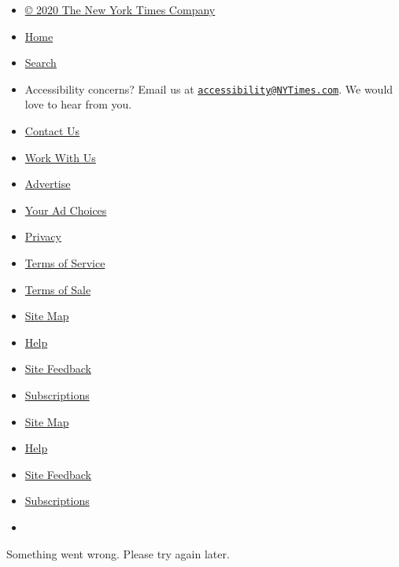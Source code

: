\begin{itemize}
\tightlist
\item
  \href{https://help.nytimes3xbfgragh.onion/hc/en-us/articles/115014792127-Copyright-notice}{©
  2020 The New York Times Company}
\item
  \href{https://www.nytimes3xbfgragh.onion}{Home}
\item
  \href{http://query.nytimes3xbfgragh.onion/search/sitesearch/\#/}{Search}
\item
  Accessibility concerns? Email us at
  \href{mailto:accessibility@NYTimes.com}{\nolinkurl{accessibility@NYTimes.com}}.
  We would love to hear from you.
\item
  \href{https://www.nytimes3xbfgragh.onion/ref/membercenter/help/infoservdirectory.html}{Contact
  Us}
\item
  \href{http://www.nytco.com/careers}{Work With Us}
\item
  \href{http://nytmediakit.com/}{Advertise}
\item
  \href{https://www.nytimes3xbfgragh.onion/content/help/rights/privacy/policy/privacy-policy.html\#pp}{Your
  Ad Choices}
\item
  \href{https://www.nytimes3xbfgragh.onion/privacy}{Privacy}
\item
  \href{https://help.nytimes3xbfgragh.onion/hc/en-us/articles/115014893428-Terms-of-service}{Terms
  of Service}
\item
  \href{https://help.nytimes3xbfgragh.onion/hc/en-us/articles/115014893968-Terms-of-sale}{Terms
  of Sale}
\item
  \href{http://spiderbites.nytimes3xbfgragh.onion}{Site Map}
\item
  \href{https://help.nytimes3xbfgragh.onion/hc/en-us}{Help}
\item
  \href{https://help.nytimes3xbfgragh.onion/hc/en-us/articles/115015385887-Contact-us}{Site
  Feedback}
\item
  \href{https://www.nytimes3xbfgragh.onion/subscriptions/Multiproduct/lp5558.html?campaignId=37WXW}{Subscriptions}
\end{itemize}

\begin{itemize}
\item
  \href{http://spiderbites.nytimes3xbfgragh.onion}{Site Map}
\item
  \href{https://help.nytimes3xbfgragh.onion/hc/en-us}{Help}
\item
  \href{https://help.nytimes3xbfgragh.onion/hc/en-us/articles/115015385887-Contact-us}{Site
  Feedback}
\item
  \href{https://www.nytimes3xbfgragh.onion/subscriptions/Multiproduct/lp5558.html?campaignId=37WXW}{Subscriptions}
\item
\end{itemize}

Something went wrong. Please try again later.
